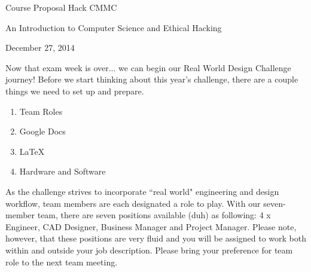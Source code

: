 \documentclass{article}
\begin{document}
\centerline{ \large Course Proposal \n Hack CMMC  }

\centerline{\sc An Introduction to Computer Science and Ethical Hacking}
\vspace{.5pc}
\centerline{\sc December 27, 2014}
 
 
\vspace{0.5pc}
\noindent Now that exam week is over... we can begin our Real World Design Challenge journey! Before we start thinking about this year's challenge, there are a couple things we need to set up and prepare. 

\begin{enumerate}
\item Team Roles
\item Google Docs
\item \LaTeX
\item Hardware and Software
\end{enumerate}

As the challenge strives to incorporate ``real world" engineering and design workflow, team members are each designated a role to play. With our seven-member team, there are seven positions available (duh) as following: 4 x Engineer, CAD Designer, Business Manager and Project Manager. Please note, however, that these positions are very fluid and you will be assigned to work both within and outside your job description. Please bring your preference for team role to the next team meeting.
\end{document}
